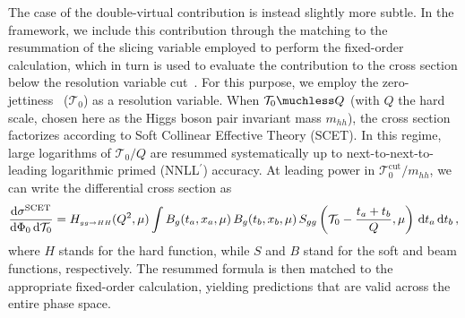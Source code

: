 The case of the double-virtual contribution is instead slightly more subtle.
In the \geneva framework, we include this contribution through the matching
to the resummation of the slicing variable employed to perform the fixed-order
calculation,
which in turn is used to evaluate the contribution to the cross section
below the resolution variable cut~\cite{Alioli:2012fc}.
For this purpose, we employ the zero-jettiness~\cite{Stewart:2010tn} ($\mathcal{T}_0$) as a resolution variable.
When $\mathcal{T}_0 \muchless Q$ (with $Q$ the hard scale,
chosen here as the Higgs boson pair invariant mass $m_{hh}$), the cross section
factorizes according to Soft Collinear Effective Theory (SCET).
In this regime,
large logarithms of $\mathcal{T}_0/Q$ are resummed systematically up to
next-to-next-to-leading logarithmic primed (NNLL$^\prime$) accuracy.
At leading power in $\mathcal{T}_0^{\mathrm{cut}} / m_{hh}$, we can write the differential cross section
as
\begin{equation}\label{eq:convolutionmess}
  \frac{\mathrm{d} \sigma^{\rm SCET}}{\mathrm{d} \Phi_0 \, \mathrm{d} \mathcal{T}_0} =
  H_{{\scriptscriptstyle gg \to HH }}(Q^2,\mu) \int B_g(t_a,x_a,\mu) \,
  B_g(t_b,x_b,\mu) \, S_{gg}\left( \mathcal{T}_0 - \frac{t_a+t_b}{Q}, \mu \right) \,
  \mathrm{d} t_a \, \mathrm{d} t_b \,,
\end{equation}
where $H$ stands for the hard function, while $S$ and $B$ stand for the soft and beam functions, respectively.
The resummed formula is then matched to the appropriate fixed-order calculation,
yielding predictions that are valid across the entire phase space.

